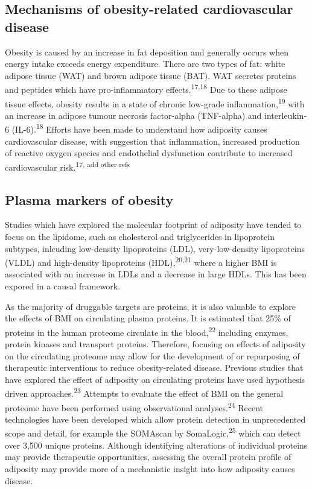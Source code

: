 \documentclass[11pt,twoside]{bristolthesis}
\begin{document}
\hypertarget{mechanisms-of-obesity-related-cardiovascular-disease}{%
\subsection{Mechanisms of obesity-related cardiovascular disease}\label{mechanisms-of-obesity-related-cardiovascular-disease}}

Obesity is caused by an increase in fat deposition and generally occurs when energy intake exceeds energy expenditure. There are two types of fat: white adipose tissue (WAT) and brown adipose tissue (BAT). WAT secretes proteins and peptides which have pro-inflammatory effects.\textsuperscript{17,18} Due to these adipose tissue effects, obesity results in a state of chronic low-grade inflammation,\textsuperscript{19} with an increase in adipose tumour necrosis factor-alpha (TNF-alpha) and interleukin-6 (IL-6).\textsuperscript{18} Efforts have been made to understand how adiposity causes cardiovascular disease, with suggestion that inflammation, increased production of reactive oxygen species and endothelial dysfunction contribute to increased cardiovascular risk.\textsuperscript{17, add other refs}

\hypertarget{plasma-markers-of-obesity}{%
\subsection{Plasma markers of obesity}\label{plasma-markers-of-obesity}}

Studies which have explored the molecular footprint of adiposity have tended to focus on the lipidome, such as cholesterol and triglycerides in lipoprotein subtypes, inlcuding low-density lipoproteins (LDL), very-low-density lipoproteins (VLDL) and high-density lipoproteins (HDL),\textsuperscript{20,21} where a higher BMI is associated with an increase in LDLs and a decrease in large HDLs. This has been expored in a causal framework.

As the majority of druggable targets are proteins, it is also valuable to explore the effects of BMI on circulating plasma proteins. It is estimated that 25\% of proteins in the human proteome circulate in the blood,\textsuperscript{22} including enzymes, protein kinases and transport proteins. Therefore, focusing on effects of adiposity on the circulating proteome may allow for the development of or repurposing of therapeutic interventions to reduce obesity-related disease. Previous studies that have explored the effect of adiposity on circulating proteins have used hypothesis driven approaches.\textsuperscript{23} Attempts to evaluate the effect of BMI on the general proteome have been performed using observational analyses.\textsuperscript{24} Recent technologies have been developed which allow protein detection in unprecedented scope and detail, for example the SOMAscan by SomaLogic,\textsuperscript{25} which can detect over 3,500 unique proteins. Although identifying alterations of individual proteins may provide therapeutic opportunities, assessing the overall protein profile of adiposity may provide more of a mechanistic insight into how adiposity causes disease.
\end{document}
